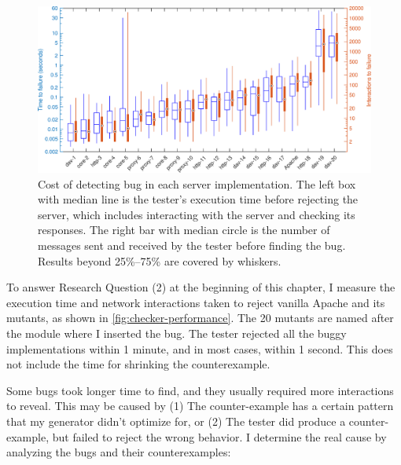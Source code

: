 \begin{figure}
  \includegraphics[width=\textwidth]{figures/http-time}
  \caption[Cost of detecting bug in each server/mutant.]{Cost of detecting bug
    in each server implementation.  The left box with median line is the
    tester's execution time before rejecting the server, which includes
    interacting with the server and checking its responses.  The right bar with
    median circle is the number of \http messages sent and received by the
    tester before finding the bug.  Results beyond 25\%--75\% are covered by
    whiskers.
  }
  \label{fig:checker-performance}
\end{figure}

To answer Research Question (2) at the beginning of this chapter, I measure the
execution time and network interactions taken to reject vanilla Apache and its
mutants, as shown in \autoref{fig:checker-performance}.  The 20 mutants are
named after the module where I inserted the bug.  The tester rejected all the
buggy implementations within 1 minute, and in most cases, within 1 second.  This
does not include the time for shrinking the counterexample.

Some bugs took longer time to find, and they usually required more interactions
to reveal.  This may be caused by (1) The counter-example has a certain pattern
that my generator didn't optimize for, or (2) The tester did produce a
counter-example, but failed to reject the wrong behavior.  I determine the real
cause by analyzing the bugs and their counterexamples:

